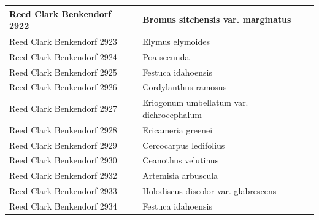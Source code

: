 \documentclass[
]{article}
\begin{document}
\begin{longtable}{l|l}
\hline
Reed Clark Benkendorf 2922 & Bromus sitchensis var. marginatus\\
\hline
Reed Clark Benkendorf 2923 & Elymus elymoides\\
\hline
Reed Clark Benkendorf 2924 & Poa secunda\\
\hline
Reed Clark Benkendorf 2925 & Festuca idahoensis\\
\hline
Reed Clark Benkendorf 2926 & Cordylanthus ramosus\\
\hline
Reed Clark Benkendorf 2927 & Eriogonum umbellatum var. dichrocephalum\\
\hline
Reed Clark Benkendorf 2928 & Ericameria greenei\\
\hline
Reed Clark Benkendorf 2929 & Cercocarpus ledifolius\\
\hline
Reed Clark Benkendorf 2930 & Ceanothus velutinus\\
\hline
Reed Clark Benkendorf 2932 & Artemisia arbuscula\\
\hline
Reed Clark Benkendorf 2933 & Holodiscus discolor var. glabrescens\\
\hline
Reed Clark Benkendorf 2934 & Festuca idahoensis\\
\hline
\end{longtable}
\end{document}
